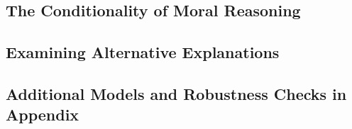 \documentclass[12pt]{article}
\begin{document}
\clearpage
\subsection*{The Conditionality of Moral Reasoning}






\clearpage
\subsection*{Examining Alternative Explanations}


\clearpage
\subsection*{Additional Models and Robustness Checks in Appendix}







\end{document}

